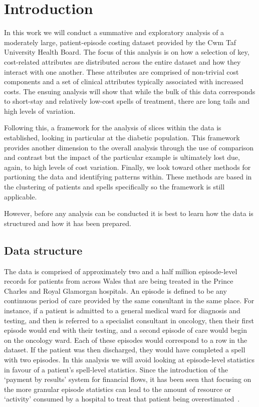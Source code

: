 \section{Introduction}\label{sec:intro}

In this work we will conduct a summative and exploratory analysis of a
moderately large, patient-episode costing dataset provided by the Cwm Taf
University Health Board. The focus of this analysis is on how a selection of
key, cost-related attributes are distributed across the entire dataset and how
they interact with one another. These attributes are comprised of non-trivial
cost components and a set of clinical attributes typically associated with
increased costs. The ensuing analysis will show that while the bulk of this data
corresponds to short-stay and relatively low-cost spells of treatment, there are
long tails and high levels of variation.
        
Following this, a framework for the analysis of slices within the data is
established, looking in particular at the diabetic population. This framework
provides another dimension to the overall analysis through the use of comparison
and contrast but the impact of the particular example is ultimately lost due,
again, to high levels of cost variation. Finally, we look toward other methods
for partioning the data and identifying patterns within. These methods are based
in the clustering of patients and spells specifically so the framework is still
applicable.

However, before any analysis can be conducted it is best to learn how the data
is structured and how it has been prepared.

\subsection{Data structure}\label{subsec:structure}

The data is comprised of approximately two and a half million episode-level
records for patients from across Wales that are being treated in the Prince
Charles and Royal Glamorgan hospitals. An episode is defined to be any
continuous period of care provided by the same consultant in the same place. For
instance, if a patient is admitted to a general medical ward for diagnosis and
testing, and then is referred to a specialist consultant in oncology, then their
first episode would end with their testing, and a second episode of care would
begin on the oncology ward. Each of these episodes would correspond to a row in
the dataset. If the patient was then discharged, they would have completed a
spell with two episodes. In this analysis we will avoid looking at episode-level
statistics in favour of a patient's spell-level statistics. Since the
introduction of the `payment by results' system for financial flows, it has been
seen that focusing on the more granular episode statistics can lead to the
amount of resource or `activity' consumed by a hospital to treat that patient
being overestimated~\cite{BMJ2004}.

